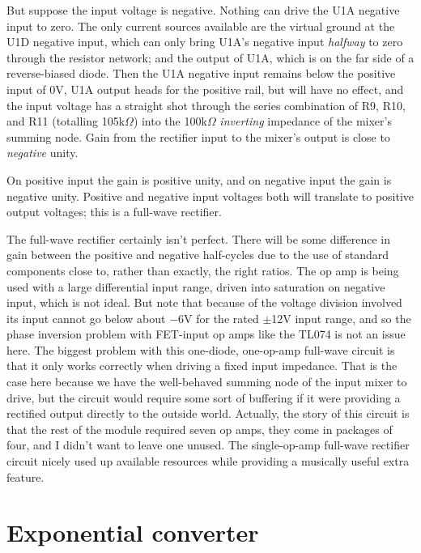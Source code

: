 But suppose the input voltage is negative.  Nothing can drive the U1A
negative input to zero.  The only current sources available are the virtual
ground at the U1D negative input, which can only bring U1A's negative input
\textit{halfway} to zero through the resistor network; and the output of
U1A, which is on the far side of a reverse-biased diode.  Then the U1A
negative input remains below the positive input of 0V, U1A output heads for
the positive rail, but will have no effect, and the input voltage has a
straight shot through the series combination of R9, R10, and R11 (totalling
105k$\Omega$) into the 100k$\Omega$ \emph{inverting} impedance of the
mixer's summing node.  Gain from the rectifier input to the mixer's output
is close to \emph{negative} unity.

On positive input the gain is positive unity, and on negative input the gain
is negative unity.  Positive and negative input voltages both will translate
to positive output voltages; this is a full-wave rectifier.

The full-wave rectifier certainly isn't perfect.  There will be some
difference in gain between the positive and negative half-cycles due to the
use of standard components close to, rather than exactly, the right ratios. 
The op amp is being used with a large differential input range, driven into
saturation on negative input, which is not ideal.  But note that because of
the voltage division involved its input cannot go below about $-$6V for the
rated $\pm$12V input range, and so the phase inversion problem with
FET-input op amps like the TL074 is not an issue here.  The biggest problem
with this one-diode, one-op-amp full-wave circuit is that it only works
correctly when driving a fixed input impedance.  That is the case here
because we have the well-behaved summing node of the input mixer to drive,
but the circuit would require some sort of buffering if it were providing a
rectified output directly to the outside world.  Actually, the story of this
circuit is that the rest of the module required seven op amps, they come in
packages of four, and I didn't want to leave one unused.  The single-op-amp
full-wave rectifier circuit nicely used up available resources while
providing a musically useful extra feature.


\section{Exponential converter}

